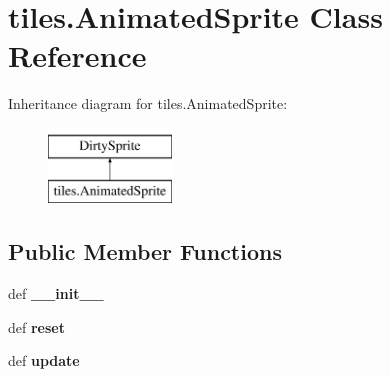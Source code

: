 \hypertarget{classtiles_1_1AnimatedSprite}{\section{tiles.\-Animated\-Sprite Class Reference}
\label{classtiles_1_1AnimatedSprite}
}
Inheritance diagram for tiles.\-Animated\-Sprite\-:\begin{figure}[H]
\begin{center}
\leavevmode
\includegraphics[height=2.000000cm]{classtiles_1_1AnimatedSprite}
\end{center}
\end{figure}
\subsection*{Public Member Functions}
\begin{DoxyCompactItemize}
\item 
\hypertarget{classtiles_1_1AnimatedSprite_ad45bb8638c7d1ffd137af2c0cb21a86a}{def {\bfseries \-\_\-\-\_\-init\-\_\-\-\_\-}}\label{classtiles_1_1AnimatedSprite_ad45bb8638c7d1ffd137af2c0cb21a86a}

\item 
\hypertarget{classtiles_1_1AnimatedSprite_a9dc14e2635930ba51d977455c7024eb0}{def {\bfseries reset}}\label{classtiles_1_1AnimatedSprite_a9dc14e2635930ba51d977455c7024eb0}

\item 
\hypertarget{classtiles_1_1AnimatedSprite_ad86444bfea97a89ca781a60f6e18fa28}{def {\bfseries update}}\label{classtiles_1_1AnimatedSprite_ad86444bfea97a89ca781a60f6e18fa28}

\end{DoxyCompactItemize}
